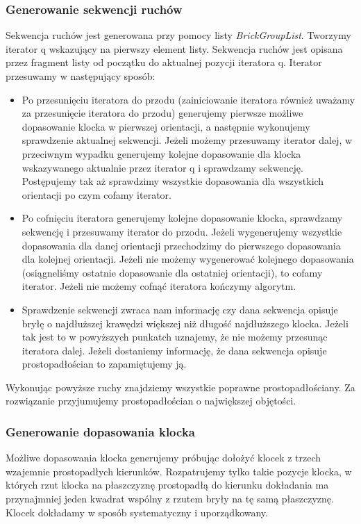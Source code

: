 \documentclass[12pt]{article}
\begin{document}
\subsubsection{Generowanie sekwencji ruchów}
Sekwencja ruchów jest generowana przy pomocy listy \textit{BrickGroupList}. Tworzymy iterator q wskazujący na pierwszy
element listy. Sekwencja ruchów jest opisana przez fragment listy od początku do aktualnej pozycji iteratora q.
Iterator przesuwamy w następujący sposób:
\begin{itemize}
 \item Po przesunięciu iteratora do przodu (zainiciowanie iteratora również uważamy za przesunięcie iteratora do przodu)
generujemy pierwsze możliwe dopasowanie klocka w pierwszej orientacji, a następnie
wykonujemy sprawdzenie aktualnej sekwencji. Jeżeli możemy przesuwamy iterator dalej, w przeciwnym wypadku generujemy kolejne
dopasowanie dla klocka wskazywanego aktualnie przez iterator q i sprawdzamy sekwencję. Postępujemy tak aż sprawdzimy
wszystkie dopasowania dla wszystkich orientacji po czym cofamy iterator.
 \item Po cofnięciu iteratora generujemy kolejne dopasowanie klocka, sprawdzamy sekwencję i przesuwamy iterator do przodu.
 Jeżeli wygenerujemy wszystkie dopasowania dla danej orientacji przechodzimy do pierwszego dopasowania dla kolejnej orientacji.
 Jeżeli nie możemy wygenerować kolejnego dopasowania (osiągneliśmy ostatnie dopasowanie dla ostatniej orientacji), to 
 cofamy iterator. Jeżeli nie możemy cofnąć iteratora kończymy algorytm.
 \item Sprawdzenie sekwencji zwraca nam informację czy dana sekwencja opisuje bryłę o najdłuższej krawędzi większej niż
długość najdłuższego klocka. Jeżeli tak jest to w powyższych punkatch uznajemy, że nie możemy przesunąc iteratora dalej.
Jeżeli dostaniemy informację, że dana sekwencja opisuje prostopadłościan to zapamiętujemy ją.
 \end{itemize}
Wykonując powyższe ruchy znajdziemy wszystkie poprawne prostopadłościany. Za rozwiązanie przyjumujemy prostopadłościan o
największej objętości.
\subsubsection{Generowanie dopasowania klocka}
Możliwe dopasowania klocka generujemy próbując dołożyć klocek z trzech wzajemnie prostopadłych kierunków. Rozpatrujemy
tylko takie pozycje klocka, w których rzut  klocka na płaszczyznę prostopadłą do kierunku dokładania ma przynajmniej 
jeden kwadrat wspólny z rzutem bryły na tę samą płaszczyznę. Klocek dokładamy w sposób systematyczny i uporządkowany.
\end{document}
